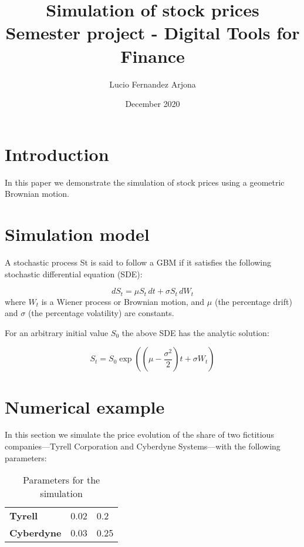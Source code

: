 \documentclass{article}
\title{Simulation of stock prices \\ Semester project - Digital Tools for Finance}
\author{Lucio Fernandez Arjona}
\date{December 2020}
\begin{document}
\maketitle

\tableofcontents

\section{Introduction}
In this paper we demonstrate the simulation of stock prices using a geometric Brownian motion.

\section{Simulation model}
A stochastic process St is said to follow a GBM if it satisfies the following stochastic differential equation (SDE):

\[dS_{t}=\mu S_{t}\,dt+\sigma S_{t}\,dW_{t}\]
where $W_{t}$ is a Wiener process or Brownian motion, and $\mu$  (the percentage drift) and $\sigma$  (the percentage volatility) are constants.

For an arbitrary initial value $S_0$ the above SDE has the analytic solution:

\[S_{t}=S_{0}\exp \left(\left(\mu -{\frac {\sigma ^{2}}{2}}\right)t+\sigma W_{t}\right)\]

\section{Numerical example}
In this section we simulate the price evolution of the share of two fictitious companies---Tyrell Corporation and Cyberdyne Systems---with the following parameters:

\begin{table}[]
\begin{tabular}{lll}
\toprule
                   & \boldsymbol{\mu} & \boldsymbol{\sigma} \\ 
\midrule
\textbf{Tyrell}    & 0.02         & 0.2             \\ 
\textbf{Cyberdyne} & 0.03         & 0.25            \\ 
\bottomrule
\end{tabular}
\caption{Parameters for the simulation}
\end{table}
\end{document}
